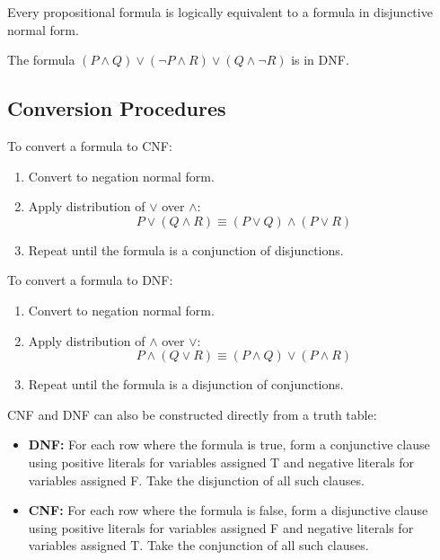 \begin{theorem}
Every propositional formula is logically equivalent to a formula in disjunctive
normal form.
\end{theorem}

\begin{example}
The formula $(P \wedge Q) \vee (\neg P \wedge R) \vee (Q \wedge \neg R)$ is in DNF.
\end{example}

\subsection{Conversion Procedures}

\begin{remark}
To convert a formula to CNF:
\begin{enumerate}
  \item Convert to negation normal form.
  \item Apply distribution of $\vee$ over $\wedge$:
  \[
  P \vee (Q \wedge R) \equiv (P \vee Q) \wedge (P \vee R)
  \]
  \item Repeat until the formula is a conjunction of disjunctions.
\end{enumerate}
\end{remark}

\begin{remark}
To convert a formula to DNF:
\begin{enumerate}
  \item Convert to negation normal form.
  \item Apply distribution of $\wedge$ over $\vee$:
  \[
  P \wedge (Q \vee R) \equiv (P \wedge Q) \vee (P \wedge R)
  \]
  \item Repeat until the formula is a disjunction of conjunctions.
\end{enumerate}
\end{remark}

\begin{remark}
CNF and DNF can also be constructed directly from a truth table:
\begin{itemize}
  \item \textbf{DNF:} For each row where the formula is true, form a conjunctive
        clause using positive literals for variables assigned T and negative
        literals for variables assigned F. Take the disjunction of all such clauses.
  \item \textbf{CNF:} For each row where the formula is false, form a disjunctive
        clause using positive literals for variables assigned F and negative
        literals for variables assigned T. Take the conjunction of all such clauses.
\end{itemize}
\end{remark}

